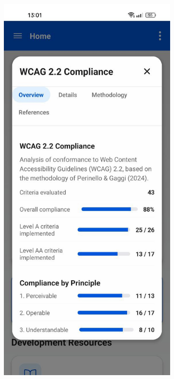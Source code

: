 \begin{figure}[ht]
    \centering
    \begin{subfigure}[b]{0.48\textwidth}
        \centering
        \includegraphics[width=\linewidth]{img/wcag-compliance.jpg}

\end{subfigure}
\end{figure}
